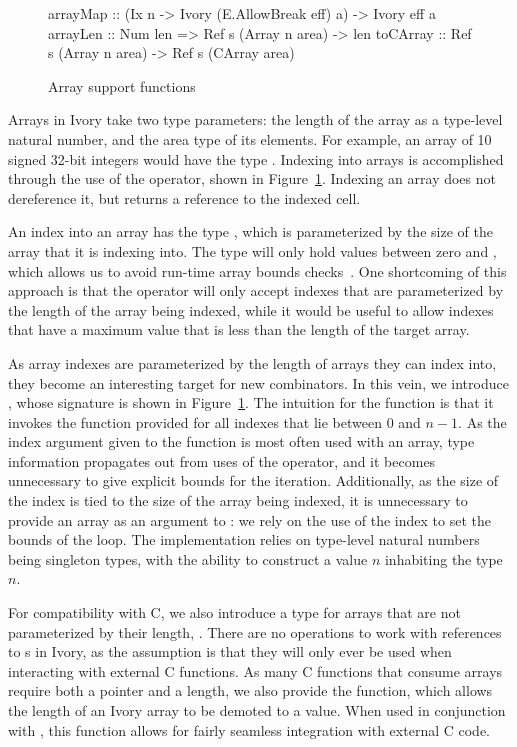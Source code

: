 \begin{figure}[t]
\begin{code}
arrayMap :: (Ix n -> Ivory (E.AllowBreak eff) a) -> Ivory eff a
arrayLen :: Num len => Ref s (Array n area) -> len
toCArray :: Ref s (Array n area)
         -> Ref s (CArray area)
\end{code}
\caption{Array support functions}
\label{array-support-functions}
\end{figure}

Arrays in Ivory take two type parameters: the length of the array as a
type-level natural number, and the area type of its elements.  For example, an
array of 10 signed 32-bit integers would have the type .  Indexing into arrays is accomplished through the use of the \cd{(!)}
operator, shown in Figure~\ref{array-support-functions}. Indexing an array does
not dereference it, but returns a reference to the indexed cell.

An index into an array has the type , which is parameterized by the size
of the array that it is indexing into.  The  type will only hold
values between zero and , which allows us to avoid run-time array bounds
checks~\cite{memareas}.  One shortcoming of this approach is that the
\cd{(!)} operator will only accept indexes that are parameterized by the length
of the array being indexed, while it would be useful to allow indexes that have
a maximum value that is less than the length of the target array.

As array indexes are parameterized by the length of arrays they can index into,
they become an interesting target for new combinators.  In this vein, we
introduce , whose signature is shown in
Figure~\ref{array-support-functions}.  The intuition for the 
function is that it invokes the function provided for all indexes that lie
between $0$ and $n - 1$.  As the index argument given to the function is most
often used with an array, type information propagates out from uses of the
\cd{(!)} operator, and it becomes unnecessary to give explicit bounds for the
iteration. Additionally, as the size of the index is tied to the size of the
array being indexed, it is unnecessary to provide an array as an argument to
: we rely on the use of the index to set the bounds of the
loop. The implementation relies on type-level natural numbers being singleton
types, with the ability to construct a value $n$ inhabiting the type $n$.

For compatibility with C, we also introduce a type for arrays that are not
parameterized by their length, .  There are no operations to work
with references to s in Ivory, as the assumption is that they will
only ever be used when interacting with external C functions.  As many C
functions that consume arrays require both a pointer and a length, we also
provide the  function, which allows the length of an Ivory array to
be demoted to a value.  When used in conjunction with , this
function allows for fairly seamless integration with external C code.


